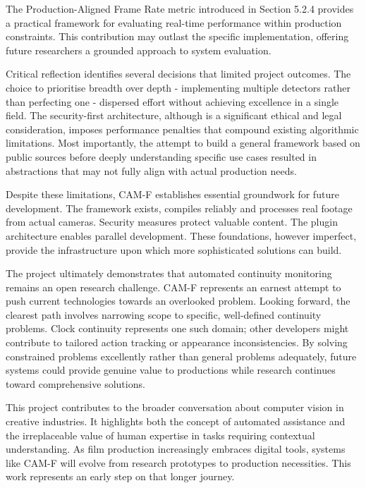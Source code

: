 The Production-Aligned Frame Rate metric introduced in Section 5.2.4 provides a practical framework for evaluating real-time performance within production constraints. This contribution may outlast the specific implementation, offering future researchers a grounded approach to system evaluation.

Critical reflection identifies several decisions that limited project outcomes. The choice to prioritise breadth over depth - implementing multiple detectors rather than perfecting one - dispersed effort without achieving excellence in a single field. The security-first architecture, although is a significant ethical and legal consideration, imposes performance penalties that compound existing algorithmic limitations. Most importantly, the attempt to build a general framework based on public sources before deeply understanding specific use cases resulted in abstractions that may not fully align with actual production needs.

Despite these limitations, CAM-F establishes essential groundwork for future development. The framework exists, compiles reliably and processes real footage from actual cameras. Security measures protect valuable content. The plugin architecture enables parallel development. These foundations, however imperfect, provide the infrastructure upon which more sophisticated solutions can build.

The project ultimately demonstrates that automated continuity monitoring remains an open research challenge. CAM-F represents an earnest attempt to push current technologies towards an overlooked problem. Looking forward, the clearest path involves narrowing scope to specific, well-defined continuity problems. Clock continuity represents one such domain; other developers might contribute to tailored action tracking or appearance inconsistencies. By solving constrained problems excellently rather than general problems adequately, future systems could provide genuine value to productions while research continues toward comprehensive solutions.

This project contributes to the broader conversation about computer vision in creative industries. It highlights both the concept of automated assistance and the irreplaceable value of human expertise in tasks requiring contextual understanding. As film production increasingly embraces digital tools, systems like CAM-F will evolve from research prototypes to production necessities. This work represents an early step on that longer journey.